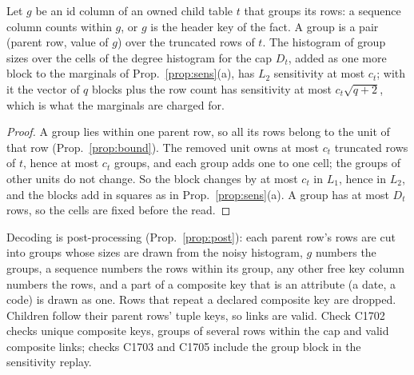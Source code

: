 \setcounter{proposition}{1701}
\begin{proposition}\label{prop:groups}
Let $g$ be an id column of an owned child table $t$ that groups its rows: a sequence column counts within $g$, or $g$ is the header key of the fact. A group is a pair (parent row, value of $g$) over the truncated rows of $t$. The histogram of group sizes over the cells of the degree histogram for the cap $D_t$, added as one more block to the marginals of Prop.~\ref{prop:sens}(a), has $L_2$ sensitivity at most $c_t$; with it the vector of $q$ blocks plus the row count has sensitivity at most $c_t\sqrt{q+2}$, which is what the marginals are charged for.
\end{proposition}
\begin{proof}
A group lies within one parent row, so all its rows belong to the unit of that row (Prop.~\ref{prop:bound}). The removed unit owns at most $c_t$ truncated rows of $t$, hence at most $c_t$ groups, and each group adds one to one cell; the groups of other units do not change. So the block changes by at most $c_t$ in $L_1$, hence in $L_2$, and the blocks add in squares as in Prop.~\ref{prop:sens}(a). A group has at most $D_t$ rows, so the cells are fixed before the read.
\end{proof}
\noindent Decoding is post-processing (Prop.~\ref{prop:post}): each parent row's rows are cut into groups whose sizes are drawn from the noisy histogram, $g$ numbers the groups, a sequence numbers the rows within its group, any other free key column numbers the rows, and a part of a composite key that is an attribute (a date, a code) is drawn as one. Rows that repeat a declared composite key are dropped. Children follow their parent rows' tuple keys, so links are valid. Check C1702 checks unique composite keys, groups of several rows within the cap and valid composite links; checks C1703 and C1705 include the group block in the sensitivity replay.

